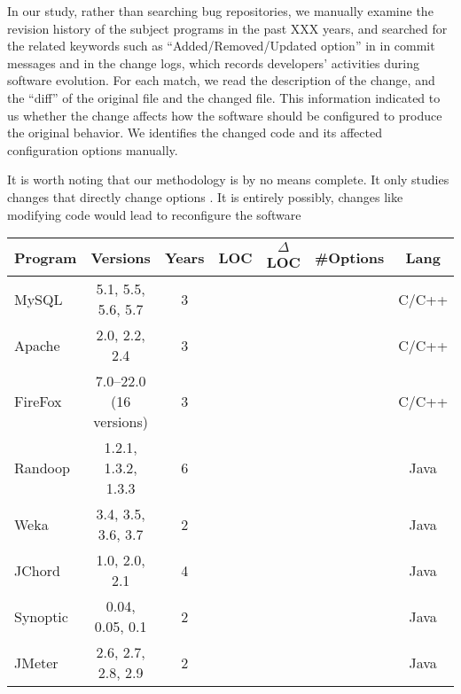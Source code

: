 In our study, rather than searching bug repositories,
we manually examine the revision history of the subject programs
in the past XXX years, and searched for the related
keywords such as ``Added/Removed/Updated option'' in
in commit messages and in the change logs,
which records developers' activities
during software evolution. For each match,
we read the description of the change,
and the ``diff'' of the original file and the
changed file. This information indicated
to us whether the change affects how the
software should be configured to produce
the original behavior. We identifies the
changed code and its affected configuration options
manually.

It is worth noting that our methodology
is by no means complete. It only studies
changes that directly change options .
It is entirely possibly, changes like
modifying code would lead to reconfigure
the software


\begin{table}[t]
\vspace{1mm}
\centering
\small{
\setlength{\tabcolsep}{.40\tabcolsep}
\begin{tabular}{|l||c|c|c|c|c|c|}
\hline
 Program & Versions & Years & LOC & $\Delta$LOC & \#Options & Lang\\
 \hline
 \hline
 MySQL & 5.1, 5.5, 5.6, 5.7 & 3 && & &C/C++\\
 Apache& 2.0, 2.2, 2.4 & 3 && & &C/C++\\
 FireFox& 7.0--22.0 (16 versions) & 3 && & &C/C++\\
 Randoop & 1.2.1, 1.3.2, 1.3.3 & 6 &  &  &  &Java\\
 Weka & 3.4, 3.5, 3.6, 3.7  & 2  & && &Java\\
 JChord & 1.0, 2.0, 2.1 &  4 & & & &Java\\
 Synoptic & 0.04, 0.05, 0.1 & 2 & & & &Java\\
 JMeter & 2.6, 2.7, 2.8, 2.9& 2 & & & &Java\\
\hline
\end{tabular}
}
\vspace{-2mm}
\end{table}



